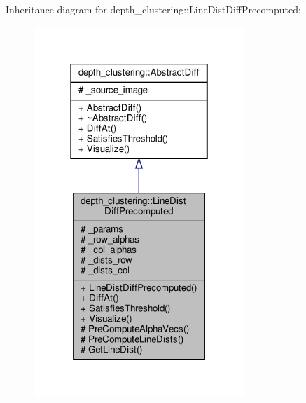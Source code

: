 Inheritance diagram for depth\+\_\+clustering\+:\+:Line\+Dist\+Diff\+Precomputed\+:\nopagebreak
\begin{figure}[H]
\begin{center}
\leavevmode
\includegraphics[width=226pt]{classdepth__clustering_1_1LineDistDiffPrecomputed__inherit__graph}
\end{center}
\end{figure}


